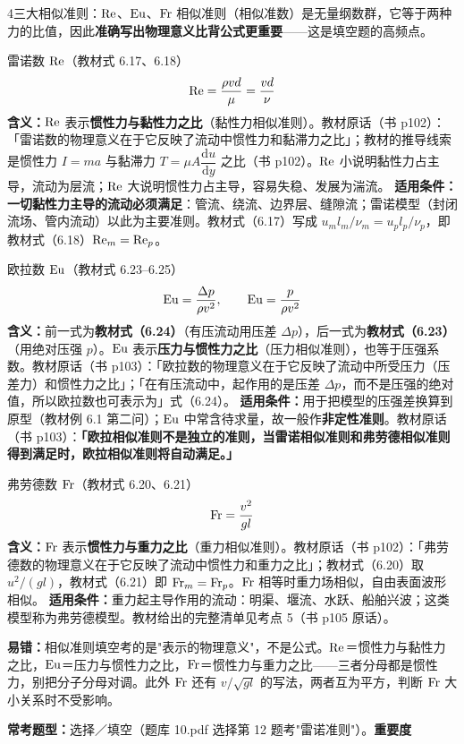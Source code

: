 \begin{kaodian}{4}{三大相似准则：$\mathrm{Re}$、$\mathrm{Eu}$、$\mathrm{Fr}$}
相似准则（相似准数）是无量纲数群，它等于两种力的比值，因此\textbf{准确写出物理意义比背公式更重要}——这是填空题的高频点。

\begin{gongshi}{雷诺数 $\mathrm{Re}$（教材式 6.17、6.18）}
\[ \mathrm{Re}=\frac{\rho v d}{\mu}=\frac{v d}{\nu} \]
\textbf{含义：}$\mathrm{Re}$ 表示\textbf{惯性力与黏性力之比}（黏性力相似准则）。教材原话（书 p102）：「雷诺数的物理意义在于它反映了流动中惯性力和黏滞力之比」；教材的推导线索是惯性力 $I=ma$ 与黏滞力 $T=\mu A\dfrac{\mathrm{d}u}{\mathrm{d}y}$ 之比（书 p102）。$\mathrm{Re}$ 小说明黏性力占主导，流动为层流；$\mathrm{Re}$ 大说明惯性力占主导，容易失稳、发展为湍流。
\textbf{适用条件：}\textbf{一切黏性力主导的流动必须满足}：管流、绕流、边界层、缝隙流；雷诺模型（封闭流场、管内流动）以此为主要准则。教材式（6.17）写成 $u_ml_m/\nu_m=u_pl_p/\nu_p$，即教材式（6.18）$\mathrm{Re}_m=\mathrm{Re}_p$。
\end{gongshi}

\begin{gongshi}{欧拉数 $\mathrm{Eu}$（教材式 6.23--6.25）}
\[ \mathrm{Eu}=\frac{\Delta p}{\rho v^{2}},\qquad \mathrm{Eu}=\frac{p}{\rho v^{2}} \]
\textbf{含义：}前一式为\textbf{教材式（6.24）}（有压流动用压差 $\Delta p$），后一式为\textbf{教材式（6.23）}（用绝对压强 $p$）。$\mathrm{Eu}$ 表示\textbf{压力与惯性力之比}（压力相似准则），也等于压强系数。教材原话（书 p103）：「欧拉数的物理意义在于它反映了流动中所受压力（压差力）和惯性力之比」；「在有压流动中，起作用的是压差 $\Delta p$，而不是压强的绝对值，所以欧拉数也可表示为」式（6.24）。
\textbf{适用条件：}用于把模型的压强差换算到原型（教材例 6.1 第二问）；$\mathrm{Eu}$ 中常含待求量，故一般作\textbf{非定性准则}。教材原话（书 p103）：\textbf{「欧拉相似准则不是独立的准则，当雷诺相似准则和弗劳德相似准则得到满足时，欧拉相似准则将自动满足。」}
\end{gongshi}

\begin{gongshi}{弗劳德数 $\mathrm{Fr}$（教材式 6.20、6.21）}
\[ \mathrm{Fr}=\frac{v^{2}}{gl} \]
\textbf{含义：}$\mathrm{Fr}$ 表示\textbf{惯性力与重力之比}（重力相似准则）。教材原话（书 p102）：「弗劳德数的物理意义在于它反映了流动中惯性力和重力之比」；教材式（6.20）取 $u^{2}/(gl)$，教材式（6.21）即 $\mathrm{Fr}_m=\mathrm{Fr}_p$。$\mathrm{Fr}$ 相等时重力场相似，自由表面波形相似。
\textbf{适用条件：}重力起主导作用的流动：明渠、堰流、水跃、船舶兴波；这类模型称为弗劳德模型。教材给出的完整清单见考点 5（书 p105 原话）。
\end{gongshi}

\begin{yicuo}
\textbf{易错：}相似准则填空考的是"表示的物理意义"，不是公式。$\mathrm{Re}$＝惯性力与黏性力之比，$\mathrm{Eu}$＝压力与惯性力之比，$\mathrm{Fr}$＝惯性力与重力之比——三者分母都是惯性力，别把分子分母对调。此外 $\mathrm{Fr}$ 还有 $v/\sqrt{gl}$ 的写法，两者互为平方，判断 $\mathrm{Fr}$ 大小关系时不受影响。
\end{yicuo}

\textbf{常考题型：}选择／填空（题库 10.pdf 选择第 12 题考"雷诺准则"）。\quad\textbf{重要度 }\quad{}\quad{}
\end{kaodian}

